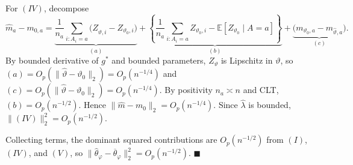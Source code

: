 For $(IV)$, decompose
\[
\widehat m_a-m_{0,a}
= \underbrace{\frac{1}{n_a}\sum_{i:A_i=a}\big(Z_{\widehat\vartheta,i}-Z_{\vartheta_0,i}\big)}_{(a)}
+\underbrace{\left\{\frac{1}{n_a}\sum_{i:A_i=a}Z_{\vartheta_0,i}-\mathbb E[Z_{\vartheta_0}\mid A=a]\right\}}_{(b)}
+\underbrace{\big(m_{\vartheta_0,a}-m_{\widehat\vartheta,a}\big)}_{(c)}.
\]
By bounded derivative of $g^\ast$ and bounded parameters, $Z_\vartheta$ is Lipschitz in $\vartheta$,
so $(a)=O_p(\|\widehat\vartheta-\vartheta_0\|_2)=O_p(n^{-1/4})$ and $(c)=O_p(\|\widehat\vartheta-\vartheta_0\|_2)=O_p(n^{-1/4})$.
By positivity $n_a\asymp n$ and CLT, $(b)=O_p(n^{-1/2})$.
Hence $\|\widehat m-m_0\|_2=O_p(n^{-1/4})$. Since $\widehat\lambda$ is bounded,
$\|(IV)\|_2^2=O_p(n^{-1/2})$.

Collecting terms, the dominant squared contributions are $O_p(n^{-1/2})$ from $(I)$, $(IV)$, and $(V)$,
so $\|\widehat\theta_\varphi-\overline\theta_\varphi\|_2^2=O_p(n^{-1/2})$.
\hfill$\blacksquare$
